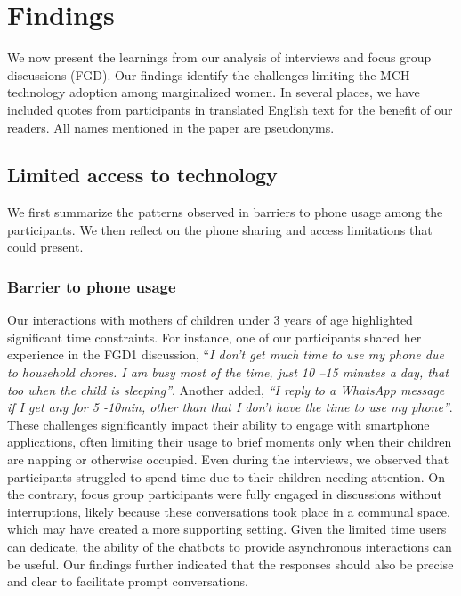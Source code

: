 \section{Findings}
We now present the learnings from our analysis of interviews and focus group discussions (FGD).  Our findings identify the challenges limiting the MCH technology adoption among marginalized women. In several places, we have included quotes from participants in translated English text for the benefit of our readers. All names mentioned in the paper are pseudonyms.

\subsection{Limited access to technology}
We first summarize the patterns observed in barriers to phone usage among the participants. We then reflect on the phone sharing and access limitations that could present.

\subsubsection{Barrier to phone usage} 
Our interactions with mothers of children under 3 years of age highlighted significant time constraints. For instance, one of our participants shared her experience in the FGD1 discussion, ``\textit{I don’t get much time to use my phone due to household chores. I am busy most of the time, just 10 –15 minutes a day, that too when the child is sleeping''}. Another added, \textit{ ``I reply to a WhatsApp message if I get any for 5 -10min, other than that I don’t have the time to use my phone''}. These challenges significantly impact their ability to engage with smartphone applications, often limiting their usage to brief moments only when their children are napping or otherwise occupied. Even during the interviews, we observed that participants struggled to spend time due to their children needing attention. On the contrary, focus group participants were fully engaged in discussions without interruptions, likely because these conversations took place in a communal space, which may have created a more supporting setting. 
Given the limited time users can dedicate, the ability of the chatbots to provide asynchronous interactions can be useful. Our findings further indicated that the responses should also be precise and clear to facilitate prompt conversations. 

